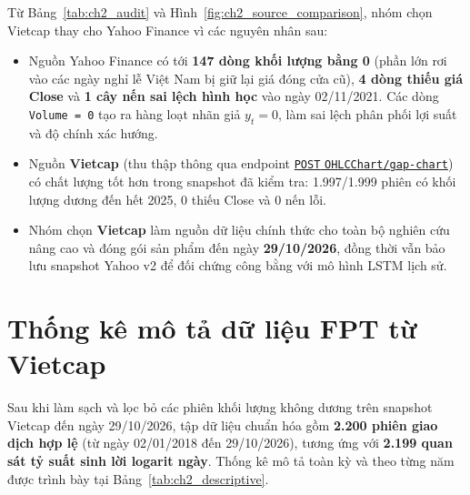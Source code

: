 \documentclass[12pt,a4paper]{report}
\begin{document}
Từ Bảng~\ref{tab:ch2_audit} và Hình~\ref{fig:ch2_source_comparison}, nhóm chọn Vietcap thay cho Yahoo Finance vì các nguyên nhân sau:
\begin{itemize}
    \item Nguồn Yahoo Finance có tới \textbf{147 dòng khối lượng bằng 0} (phần lớn rơi vào các ngày nghỉ lễ Việt Nam bị giữ lại giá đóng cửa cũ), \textbf{4 dòng thiếu giá Close} và \textbf{1 cây nến sai lệch hình học} vào ngày 02/11/2021. Các dòng \texttt{Volume = 0} tạo ra hàng loạt nhãn giả $y_t = 0$, làm sai lệch phân phối lợi suất và độ chính xác hướng.
    \item Nguồn \textbf{Vietcap} (thu thập thông qua endpoint \href{https://trading.vietcap.com.vn/api/chart/OHLCChart/gap-chart}{\texttt{POST} \nolinkurl{OHLCChart/gap-chart}}) có chất lượng tốt hơn trong snapshot đã kiểm tra: 1.997/1.999 phiên có khối lượng dương đến hết 2025, 0 thiếu Close và 0 nến lỗi.
    \item Nhóm chọn \textbf{Vietcap} làm nguồn dữ liệu chính thức cho toàn bộ nghiên cứu nâng cao và đóng gói sản phẩm đến ngày \textbf{29/10/2026}, đồng thời vẫn bảo lưu snapshot Yahoo v2 để đối chứng công bằng với mô hình LSTM lịch sử.
\end{itemize}

\section{Thống kê mô tả dữ liệu FPT từ Vietcap}
Sau khi làm sạch và lọc bỏ các phiên khối lượng không dương trên snapshot Vietcap đến ngày 29/10/2026, tập dữ liệu chuẩn hóa gồm \textbf{2.200 phiên giao dịch hợp lệ} (từ ngày 02/01/2018 đến 29/10/2026), tương ứng với \textbf{2.199 quan sát tỷ suất sinh lời logarit ngày}. Thống kê mô tả toàn kỳ và theo từng năm được trình bày tại Bảng~\ref{tab:ch2_descriptive}.
\end{document}
